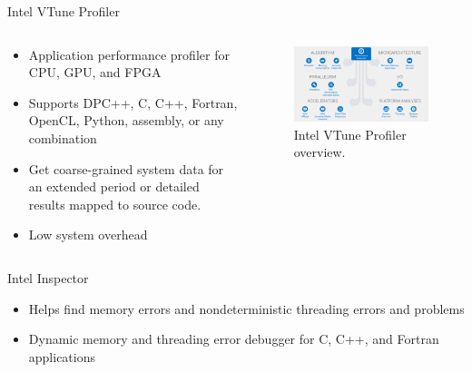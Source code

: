 \documentclass[aspectratio=169]{beamer}
\begin{document}
\begin{frame}{Intel VTune Profiler}
\begin{columns}
\begin{column}{0.5\textwidth}
\begin{itemize}
  \item Application performance profiler for CPU, GPU, and FPGA
  \item Supports DPC++, C, C++, Fortran, OpenCL, Python, assembly, or any combination
  \item Get coarse-grained system data for an extended period or detailed results mapped to source code.
  \item Low system overhead
\end{itemize}
\end{column}
\begin{column}{0.5\textwidth}
\begin{figure}
  \includegraphics[width=\linewidth]{figures/diagram-vtune-bigpicture-16x9.png}
  \caption{Intel VTune Profiler overview.}
\end{figure}
\end{column}
\end{columns}
\end{frame}

\begin{frame}{Intel Inspector}
\begin{itemize}
  \item Helps find memory errors and nondeterministic threading errors and problems
  \item Dynamic memory and threading error debugger for C, C++, and Fortran applications
\end{itemize}
\end{frame}
\end{document}
